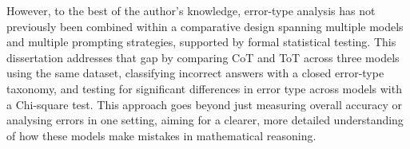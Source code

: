 However, to the best of the author's knowledge, error-type analysis has
not previously been combined within a comparative design spanning
multiple models and multiple prompting strategies, supported by formal
statistical testing. This dissertation addresses that gap by comparing
CoT and ToT across three models using the same dataset, classifying
incorrect answers with a closed error-type taxonomy, and testing for
significant differences in error type across models with a Chi-square
test. This approach goes beyond just measuring overall accuracy or
analysing errors in one setting, aiming for a clearer, more detailed
understanding of how these models make mistakes in mathematical
reasoning.
